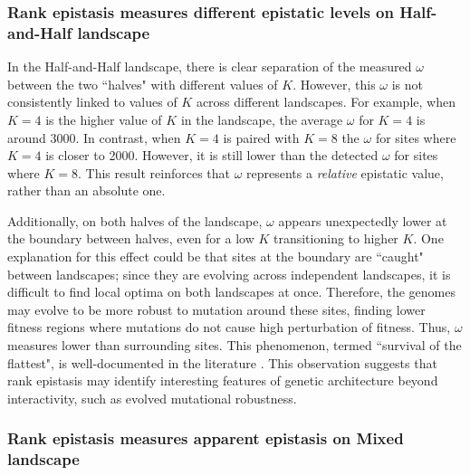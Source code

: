 \subsubsection{Rank epistasis measures different epistatic levels on Half-and-Half landscape}

In the Half-and-Half landscape, there is clear separation of the measured $\omega$ between the two ``halves" with different values of $K$. However, this $\omega$ is not consistently linked to values of $K$ across different landscapes. For example, when $K=4$ is the higher value of $K$ in the landscape, the average $\omega$ for $K=4$ is around 3000. In contrast, when $K=4$ is paired with $K=8$ the $\omega$ for sites where $K=4$ is closer to 2000. However, it is still lower than the detected $\omega$ for sites where $K=8$. This result reinforces that $\omega$ represents a \textit{relative} epistatic value, rather than an absolute one. 

Additionally, on both halves of the landscape, $\omega$ appears unexpectedly lower at the boundary between halves, even for a low $K$ transitioning to higher $K$. One explanation for this effect could be that sites at the boundary are ``caught" between landscapes; since they are evolving across independent landscapes, it is difficult to find local optima on both landscapes at once. Therefore, the genomes may evolve to be more robust to mutation around these sites, finding lower fitness regions where mutations do not cause high perturbation of fitness. Thus, $\omega$ measures lower than surrounding sites. This phenomenon, termed ``survival of the flattest", is well-documented in the literature \citep{wilke_evolution_2001, franklin_mapping_2019}. This observation suggests that rank epistasis may identify interesting features of genetic architecture beyond interactivity, such as evolved mutational robustness.

\subsubsection{Rank epistasis measures apparent epistasis on Mixed landscape}

